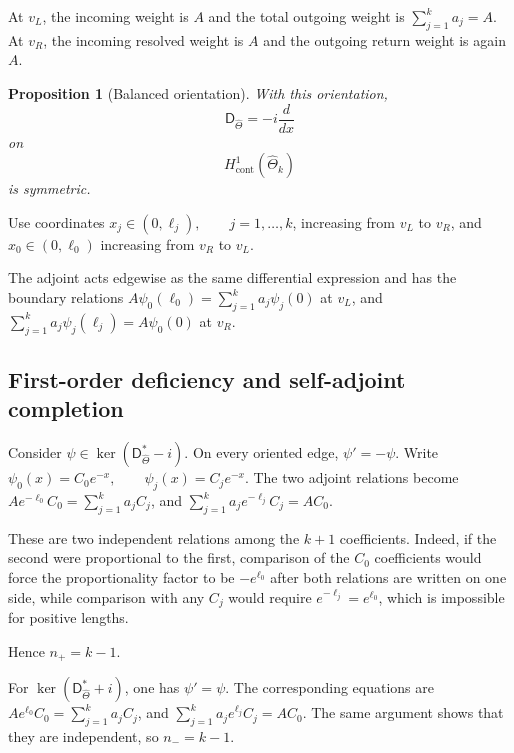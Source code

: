\documentclass[11pt]{article}
\theoremstyle{plain}
\newtheorem{proposition}[theorem]{Proposition}
\theoremstyle{definition}
\begin{document}
At \(v_L\), the incoming weight is \(A\) and the total outgoing weight is
\(\sum_{j=1}^{k}a_j=A\).
At \(v_R\), the incoming resolved weight is \(A\) and the outgoing return
weight is again \(A\).

\begin{proposition}[Balanced orientation]
\label{prop:compact-theta-balanced-orientation}
With this orientation,
\[
  \mathsf D_{\widehat\Theta}
  =
  -i\frac{d}{dx}
\]
on
\[
  H^1_{\mathrm{cont}}(\widehat\Theta_k)
\]
is symmetric.
\end{proposition}

Use coordinates
\(x_j\in(0,\ell_j), \qquad j=1,\ldots,k\),
increasing from \(v_L\) to \(v_R\), and \(x_0\in(0,\ell_0)\) increasing from \(v_R\) to \(v_L\).

The adjoint acts edgewise as the same differential expression and has the
boundary relations \(A\psi_0(\ell_0) = \sum_{j=1}^{k}a_j\psi_j(0)\) at \(v_L\), and \(\sum_{j=1}^{k}a_j\psi_j(\ell_j) = A\psi_0(0)\) at \(v_R\).

\subsection{First-order deficiency and self-adjoint completion}
\label{subsec:compact-theta-deficiency}
\label{subsec:compact-theta-SA}

Consider
\(\psi\in \ker( \mathsf D_{\widehat\Theta}^*-i )\).
On every oriented edge,
\(\psi'=-\psi\).
Write
\(\psi_0(x)=C_0e^{-x}, \qquad \psi_j(x)=C_je^{-x}\).
The two adjoint relations become
\(Ae^{-\ell_0}C_0 = \sum_{j=1}^{k}a_jC_j\),
and
\(\sum_{j=1}^{k} a_je^{-\ell_j}C_j = AC_0\).

These are two independent relations among the \(k+1\) coefficients. Indeed,
if the second were proportional to the first, comparison of the \(C_0\)
coefficients would force the proportionality factor to be \(-e^{\ell_0}\) after both relations are written on one side, while comparison with any
\(C_j\) would require
\(e^{-\ell_j}=e^{\ell_0}\),
which is impossible for positive lengths.

Hence
\(n_+=k-1\).

For
\(\ker( \mathsf D_{\widehat\Theta}^*+i )\),
one has
\(\psi'=\psi\).
The corresponding equations are
\(Ae^{\ell_0}C_0 = \sum_{j=1}^{k}a_jC_j\),
and
\(\sum_{j=1}^{k} a_je^{\ell_j}C_j = AC_0\).
The same argument shows that they are independent, so
\(n_-=k-1\).
\end{document}
